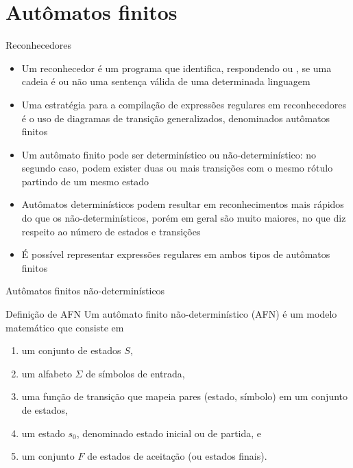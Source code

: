 \section{Autômatos finitos}

\begin{frame}[fragile]{Reconhecedores}

    \begin{itemize}
        \item Um reconhecedor é um programa que identifica, respondendo  ou , se uma cadeia é ou não uma sentença válida de uma
            determinada linguagem
        \pause

        \item Uma estratégia para a compilação de expressões regulares em reconhecedores é o uso de diagramas de transição generalizados, denominados autômatos
            finitos
        \pause

        \item Um autômato finito pode ser determinístico ou não-determinístico: no segundo caso, podem exister duas ou mais transições com o mesmo rótulo partindo
            de um mesmo estado
        \pause

        \item Autômatos determinísticos podem resultar em reconhecimentos mais rápidos do que os não-determinísticos, porém em geral são muito maiores, no
            que diz respeito ao número de estados e transições
        \pause

        \item É possível representar expressões regulares em ambos tipos de autômatos finitos
    \end{itemize}

\end{frame}

\begin{frame}[fragile]{Autômatos finitos não-determinísticos}

    \begin{block}{Definição de AFN}
        Um autômato finito não-determinístico (AFN) é um modelo matemático que consiste em
        \begin{enumerate}
            \item um conjunto de estados $S$,

            \item um alfabeto $\Sigma$ de símbolos de entrada,

            \item uma função de transição que mapeia pares (estado, símbolo) em um conjunto de estados,

            \item um estado $s_0$, denominado estado inicial ou de partida, e

            \item um conjunto $F$ de estados de aceitação (ou estados finais).
        \end{enumerate}
    \end{block}

\end{frame}

